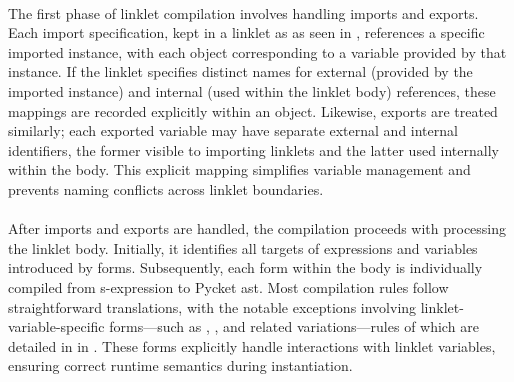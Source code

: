 		\paragraph{}%
			The first phase of linklet compilation involves handling imports and exports. Each import specification, kept in a linklet as \pycketcode{[Import ...]} as seen in , references a specific imported instance, with each  object corresponding to a variable provided by that instance. If the linklet specifies distinct names for external (provided by the imported instance) and internal (used within the linklet body) references, these mappings are recorded explicitly within an  object. Likewise, exports are treated similarly; each exported variable may have separate external and internal identifiers, the former visible to importing linklets and the latter used internally within the body. This explicit mapping simplifies variable management and prevents naming conflicts across linklet boundaries.

		\paragraph{}%
			After imports and exports are handled, the compilation proceeds with processing the linklet body. Initially, it identifies all targets of  expressions and variables introduced by  forms. Subsequently, each form within the body is individually compiled from s-expression to Pycket \gls{ast}. Most compilation rules follow straightforward translations, with the notable exceptions involving linklet-variable-specific forms—such as , , and related variations—rules of which are detailed in  in . These forms explicitly handle interactions with linklet variables, ensuring correct runtime semantics during instantiation.

